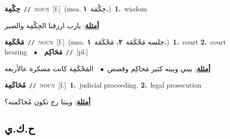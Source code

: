 \documentclass[10pt,a4paper,twoside]{article} %
\begin{document}
\begin{multicols}{2}
{\setlength\topsep{0pt}\textbf{\foreignlanguage{arabic}{حِكْمِة}}\ {\color{gray}\texttt{//}\color{black}}\ \textsc{noun}\ [f.]\ \color{gray}(msa. \foreignlanguage{arabic}{حِكْمَة}~\foreignlanguage{arabic}{\textbf{١.}})\color{black}\ \textbf{1.}~wisdom\  \begin{flushright}\color{gray}\foreignlanguage{arabic}{\textbf{\underline{\foreignlanguage{arabic}{أمثلة}}}: يارب ارزقنا الحِكْمِة والصبر}\end{flushright}\color{black}} \vspace{2mm}

{\setlength\topsep{0pt}\textbf{\foreignlanguage{arabic}{مَحْكَمِة}}\ {\color{gray}\texttt{//}\color{black}}\ \textsc{noun}\ [f.]\ \color{gray}(msa. \foreignlanguage{arabic}{جلسة مَحْكَمَة}~\foreignlanguage{arabic}{\textbf{٢.}}  \foreignlanguage{arabic}{مَحْكَمَة}~\foreignlanguage{arabic}{\textbf{١.}})\color{black}\ \textbf{1.}~court  \textbf{2.}~court hearing\ \ $\bullet$\ \ \setlength\topsep{0pt}\textbf{\foreignlanguage{arabic}{مَحَاكِم}}\ {\color{gray}\texttt{//}\color{black}}\ [pl.]\  \begin{flushright}\color{gray}\foreignlanguage{arabic}{\textbf{\underline{\foreignlanguage{arabic}{أمثلة}}}: بيني وبينه كثير مَحاكِم وقصص\ $\bullet$\ \  المَحْكَمِة كانت مسكرة عالأربعة}\end{flushright}\color{black}} \vspace{2mm}

{\setlength\topsep{0pt}\textbf{\foreignlanguage{arabic}{مُحَاكَمِة}}\ {\color{gray}\texttt{//}\color{black}}\ \textsc{noun}\ [f.]\ \textbf{1.}~judicial proceeding.  \textbf{2.}~legal prosecution\  \begin{flushright}\color{gray}\foreignlanguage{arabic}{\textbf{\underline{\foreignlanguage{arabic}{أمثلة}}}: وينتا رح تكون مُحاكَمته؟}\end{flushright}\color{black}} \vspace{2mm}

\vspace{-3mm}
\subsection*{\color{blue}\foreignlanguage{arabic}{ح.ك.ي}\color{blue}{}} 


\end{multicols}
\end{document}
